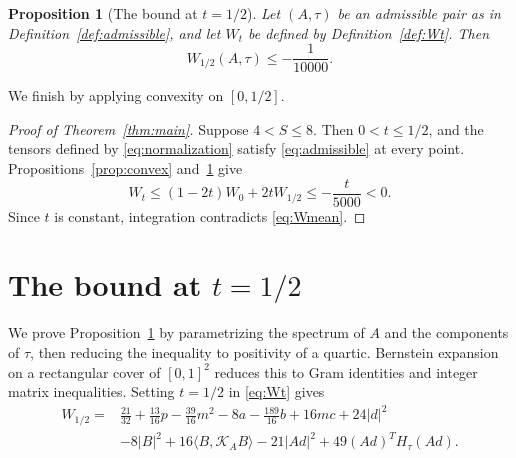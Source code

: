 \documentclass[11pt,a4paper]{amsart}
\numberwithin{equation}{section}
\newtheorem{proposition}[theorem]{Proposition}
\theoremstyle{definition}
\theoremstyle{remark}
\newcommand{\K}{\mathcal K}
\begin{document}
\begin{proposition}[The bound at $t=1/2$]\label{prop:endpoint}
Let $(A,\tau)$ be an admissible pair as in
Definition~\ref{def:admissible}, and let $W_t$ be defined by
Definition~\ref{def:Wt}. Then
\begin{equation}\label{eq:endpointbound}
 W_{1/2}(A,\tau)\le-\frac1{10000}.
\end{equation}
\end{proposition}

We finish by applying convexity on $[0,1/2]$.

\begin{proof}[Proof of Theorem~\ref{thm:main}]
Suppose $4<S\le8$. Then $0<t\le1/2$, and the tensors defined by
\eqref{eq:normalization} satisfy \eqref{eq:admissible} at every point.
Propositions~\ref{prop:convex} and~\ref{prop:endpoint} give
\[
 W_t\le(1-2t)W_0+2tW_{1/2}\le-\frac{t}{5000}<0.
\]
Since $t$ is constant, integration contradicts \eqref{eq:Wmean}.
\end{proof}

\clearpage
\appendix
\section{The bound at \texorpdfstring{$t=1/2$}{t=1/2}}\label{app:certificate}
We prove Proposition~\ref{prop:endpoint} by parametrizing the spectrum
of $A$ and the components of $\tau$, then reducing the inequality to
positivity of a quartic. Bernstein expansion on a rectangular cover of
$[0,1]^2$ reduces this to Gram identities and integer matrix inequalities.
Setting $t=1/2$ in \eqref{eq:Wt} gives
\begin{equation}\label{eq:endpointexpanded}
\begin{split}
 W_{1/2}={}&\tfrac{21}{32}+\tfrac{13}{16}p-\tfrac{39}{16}m^2
 -8a-\tfrac{189}{16}b+16mc+24|d|^2\\
 &-8|B|^2+16\langle B,\K_AB\rangle
 -21|Ad|^2+49(Ad)^TH_\tau(Ad).
\end{split}
\end{equation}
\end{document}
